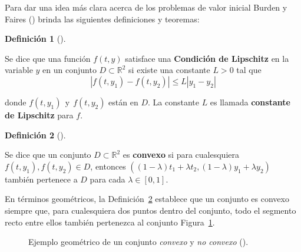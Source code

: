 \documentclass[
  spanish,
  us-letterpaper,
  DIV=11,
  numbers=noendperiod]{scrreprt}
\theoremstyle{plain}
\theoremstyle{definition}
\newtheorem{definition}{Definición}[chapter]
\theoremstyle{remark}
\begin{document}
Para dar una idea más clara acerca de los problemas de valor inicial
Burden y Faires () brinda las siguientes
definiciones y teoremas:

\begin{definition}[]\protect\hypertarget{def-Lip-con}{}\label{def-Lip-con}

Se dice que una función \(f(t,y)\) satisface una \textbf{Condición de
Lipschitz} en la variable \(y\) en un conjunto
\(D \subset \mathbb{R}^2\) si existe una constante \(L>0\) tal que \[
|f(t,y_1) - f(t,y_2)| \leq L|y_1-y_2|
\]

donde \(f(t,y_1) \ \ \text{y} \ \ f(t,y_2)\) están en \(D\). La
constante \(L\) es llamada \textbf{constante de Lipschitz} para \(f\).

\end{definition}

\begin{definition}[]\protect\hypertarget{def-convex-set}{}\label{def-convex-set}

Se dice que un conjunto \(D \subset \mathbb{R}^2\) es \textbf{convexo}
si para cualesquiera \(f(t,y_1), f(t,y_2) \in D\), entonces
\(((1-\lambda)t_1 + \lambda t_2, (1-\lambda)y_1 + \lambda y_2)\) también
pertenece a \(D\) para cada \(\lambda \in[0,1]\).

\end{definition}

En términos geométricos, la Definición~\ref{def-convex-set} establece
que un conjunto es convexo siempre que, para cualesquiera dos puntos
dentro del conjunto, todo el segmento recto entre ellos también
pertenezca al conjunto Figura~\ref{fig-convx-set}.

\begin{figure}


\caption{\label{fig-convx-set}Ejemplo geométrico de un conjunto
\emph{convexo} y \emph{no convexo} ().}

\end{figure}%
\end{document}
